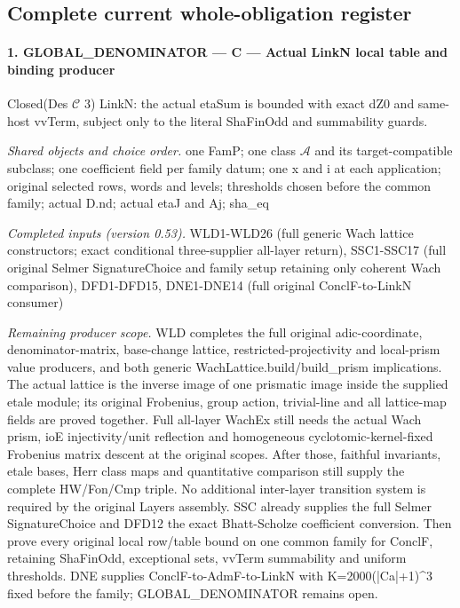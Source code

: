 \subsection{Complete current whole-obligation register}


\paragraph{1. GLOBAL\_\allowbreak DENOMINATOR — C — Actual LinkN local table and binding producer}

Closed(Des $\mathcal C$ 3) LinkN: the actual etaSum is bounded with exact dZ0 and same-host vvTerm, subject only to the literal ShaFinOdd and summability guards.

\emph{Shared objects and choice order.} one FamP; one class $\mathcal A$ and its target-compatible subclass; one coefficient field per family datum; one x and i at each application; original selected rows, words and levels; thresholds chosen before the common family; actual D.nd; actual etaJ and Aj; sha\_\allowbreak eq

\emph{Completed inputs (version 0.53).} WLD1-WLD26 (full generic Wach lattice constructors; exact conditional three-supplier all-layer return), SSC1-SSC17 (full original Selmer SignatureChoice and family setup retaining only coherent Wach comparison), DFD1-DFD15, DNE1-DNE14 (full original ConclF-to-LinkN consumer)

\emph{Remaining producer scope.} WLD completes the full original adic-coordinate, denominator-matrix, base-change lattice, restricted-projectivity and local-prism value producers, and both generic WachLattice.build/build\_\allowbreak prism implications. The actual lattice is the inverse image of one prismatic image inside the supplied etale module; its original Frobenius, group action, trivial-line and all lattice-map fields are proved together. Full all-layer WachEx still needs the actual Wach prism, ioE injectivity/unit reflection and homogeneous cyclotomic-kernel-fixed Frobenius matrix descent at the original scopes. After those, faithful invariants, etale bases, Herr class maps and quantitative comparison still supply the complete HW/Fon/Cmp triple. No additional inter-layer transition system is required by the original Layers assembly. SSC already supplies the full Selmer SignatureChoice and DFD12 the exact Bhatt-Scholze coefficient conversion. Then prove every original local row/table bound on one common family for ConclF, retaining ShaFinOdd, exceptional sets, vvTerm summability and uniform thresholds. DNE supplies ConclF-to-AdmF-to-LinkN with K=2000(|Ca|+1)\textasciicircum{}3 fixed before the family; GLOBAL\_\allowbreak DENOMINATOR remains open.

